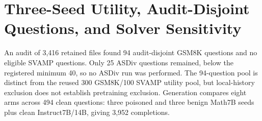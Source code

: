 \documentclass[journal,onecolumn]{IEEEtran}
\begin{document}
\section{Three-Seed Utility, Audit-Disjoint Questions, and Solver Sensitivity}
\label{sec:s13}

An audit of 3,416 retained files found 94 audit-disjoint GSM8K questions and no eligible SVAMP questions. Only 25 ASDiv questions remained, below the registered minimum 40, so no ASDiv run was performed. The 94-question pool is distinct from the reused 300 GSM8K/100 SVAMP utility pool, but local-history exclusion does not establish pretraining exclusion. Generation compares eight arms across 494 clean questions: three poisoned and three benign Math7B seeds plus clean Instruct7B/14B, giving 3,952 completions.

\begingroup\footnotesize\setlength{\tabcolsep}{4pt}
\end{document}
